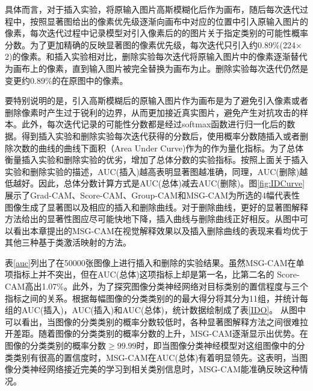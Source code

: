 具体而言，对于插入实验，将原输入图片高斯模糊化后作为画布，随后每次迭代过程中，按照显著图给出的像素优先级逐渐向画布中对应的位置中引入原输入图片的像素，每次迭代过程中记录模型对引入像素后的的图片关于指定类别的可能性概率分数。为了更加精确的反映显著图的像素优先级，每次迭代只引入约0.89\%(224$\times$2)的像素。和插入实验相对比，删除实验每次迭代将原输入图片中的像素逐渐替代为画布上的像素，直到输入图片被完全替换为画布为止。删除实验每次迭代仍然是变更约0.89\%的在原图中的像素。

要特别说明的是，引入高斯模糊后的原输入图片作为画布是为了避免引入像素或者删除像素时产生过于锐利的边界，从而更加接近真实图片，避免产生对抗攻击的样本。此外，每次迭代记录的可能性分数都是经过softmax函数进行归一化后的数据。得到插入实验和删除实验每次迭代获得的分数后，使用概率分数随插入或者删除次数的曲线的曲线下面积（Area Under Curve)作为的作为量化指标。为了总体衡量插入实验和删除实验的优劣，增加了总体分数的实验指标。按照上面关于插入实验和删除实验的描述，AUC(插入)越高表明显著图越准确，同理，AUC(删除)越低越好。因此，总体分数计算方式是AUC(总体)减去AUC(删除)。图\ref{fig:IDCurve}展示了Grad-CAM、Score-CAM、Group-CAM和MSG-CAM为所选的4幅代表性图像生成了显著图以及相应的插入和删除曲线。对于删除曲线，更好的显著图解释方法给出的显著性图应尽可能快地下降，插入曲线与删除曲线正好相反。从图中可以看出本章提出的MSG-CAM在视觉解释效果以及插入删除曲线的表现来看均优于其他三种基于类激活映射的方法。


表\ref{auc}列出了在50000张图像上进行插入和删除的实验结果。虽然MSG-CAM在单项指标上并不突出，但在AUC(总体)这项指标上却是第一名，比第二名的 Score-CAM高出1.07\%。此外，为了探究图像分类神经网络对目标类别的置信程度与三个指标之间的关系。根据每幅图像的分类类别的的最大得分将其分为11组，并统计每组的AUC(插入)，AUC(插入)和AUC(总体)，统计数据绘制成了表\ref{IDO}。 从图中可以看出，当图像的分类类别的概率分数较低时，各种显著图解释方法之间很难拉开差距。随着图像的分类类别的概率分数的上升，MSG-CAM逐渐显示出优势。在图像的分类类别的概率分数$\geq 99.99$时，即当图像分类神经模型对这组图像中的分类类别有很高的置信度时，MSG-CAM在AUC(总体)有着明显领先。这表明，当图像分类神经网络接近完美的学习到相关类别信息时，MSG-CAM能准确反映这种情况。


